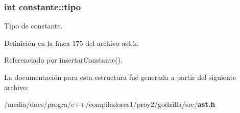 \subsubsection{\setlength{\rightskip}{0pt plus 5cm}int {\bf constante::tipo}}\label{structconstante_o0}


Tipo de constante. 



Definici\'{o}n en la l\'{\i}nea 175 del archivo ast.h.

Referenciado por insertar\-Constante().

La documentaci\'{o}n para esta estructura fu\'{e} generada a partir del siguiente archivo:\begin{CompactItemize}
\item 
/media/docs/progra/c++/compiladores1/proy2/godzilla/src/{\bf ast.h}\end{CompactItemize}
